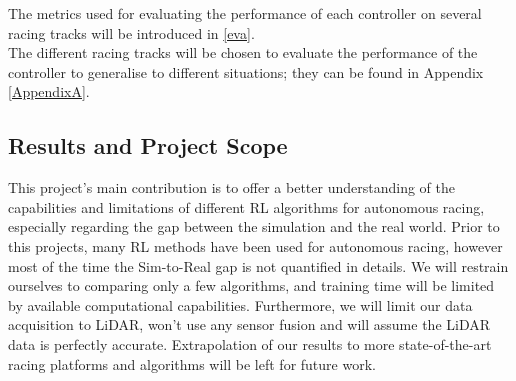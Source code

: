 The metrics used for evaluating the performance of each controller on several racing tracks will be introduced in \ref{eva}. \\

The different racing tracks will be chosen to evaluate the performance of the controller to generalise to different situations; they can be found in Appendix \ref{AppendixA}.


\subsection*{Results and Project Scope}
This project's main contribution is to offer a better understanding of the capabilities and limitations of different RL algorithms for autonomous racing, especially regarding the gap between the simulation and the real world. Prior to this projects, many RL methods have been used for autonomous racing, however most of the time the Sim-to-Real gap is not quantified in details. We will restrain ourselves to comparing only a few algorithms, and training time will be limited by available computational capabilities. Furthermore, we will limit our data acquisition to LiDAR, won't use any sensor fusion and will assume the LiDAR data is perfectly accurate. \newline
Extrapolation of our results to more state-of-the-art racing platforms and algorithms will be left for future work.
\newpage